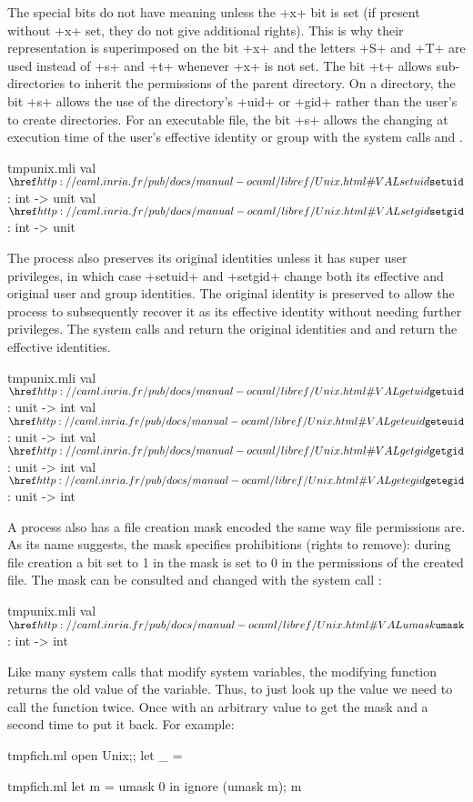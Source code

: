 The special bits do not have meaning unless the \ml+x+ bit is set (if
present without \ml+x+ set, they do not give additional rights).  This
is why their representation is superimposed on the bit \ml+x+ and
the letters \ml+S+ and \ml+T+ are used instead of \ml+s+ and \ml+t+
whenever \ml+x+ is not set. The bit \ml+t+ allows sub-directories to
inherit the permissions of the parent directory. On a directory, 
the bit \ml+s+ allows the use of the directory's \ml+uid+ or \ml+gid+ rather
than the user's to create directories. For an executable file, 
the bit \ml+s+ allows the changing at execution time of the user's
effective identity or group with the system calls  
and .
%
\begin{listingcodefile}{tmpunix.mli}
val $\libvalue{Unix}{setuid}$ : int -> unit
val $\libvalue{Unix}{setgid}$ : int -> unit
\end{listingcodefile}
%
The process also preserves its original identities unless 
it has super user privileges, in which case \ml+setuid+ and
\ml+setgid+ change both its effective and original user and group
identities. The original identity is preserved to allow 
the process to subsequently recover it as its effective identity
without needing further privileges. The system calls  and 
 return the original identities and 
 and  return the effective identities.
%
\begin{listingcodefile}{tmpunix.mli}
val $\libvalue{Unix}{getuid}$ : unit -> int
val $\libvalue{Unix}{geteuid}$ : unit -> int
val $\libvalue{Unix}{getgid}$ : unit -> int
val $\libvalue{Unix}{getegid}$ : unit -> int
\end{listingcodefile}

A process also has a file creation mask encoded the same way file
permissions are. As its name suggests, the mask specifies prohibitions
(rights to remove): during file creation a bit set to 1 in the
mask is set to 0 in the permissions of the created file.  The mask
can be consulted and changed with the system call :
%
\begin{listingcodefile}{tmpunix.mli}
val $\libvalue{Unix}{umask}$ : int -> int
\end{listingcodefile}
% 
Like many system calls that modify system variables, the modifying
function returns the old value of the variable. Thus, to just look up
the value we need to call the function twice. Once with an arbitrary
value to get the mask and a second time to put it back. For example:
%
\begin{codefile}{tmpfich.ml}
open Unix;;
let _ = 
\end{codefile}
%
\begin{listingcodefile}{tmpfich.ml}
let m = umask 0 in ignore (umask m); m
\end{listingcodefile}

